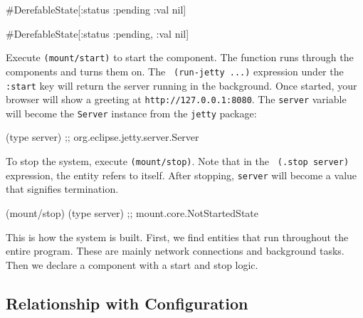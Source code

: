 \ifnarrow

\begin{english}
  \begin{clojure}
#DerefableState[{:status :pending
                 :val nil}]
  \end{clojure}
\end{english}

\else

\begin{english}
  \begin{clojure}
#DerefableState[{:status :pending, :val nil}]
  \end{clojure}
\end{english}

\fi


Execute \texttt{(mount\-/start)} to start the component. The function runs through the components and turns them on. The \verb| (run-jetty ...)| expression under the \verb|:start| key will return the server running in the background. Once started, your browser will show a greeting at \verb|http://127.0.0.1:8080|. The \verb|server| variable will become the \verb|Server| instance from the \verb|jetty| package:

\begin{english}
  \begin{clojure}
(type server)
;; org.eclipse.jetty.server.Server
  \end{clojure}
\end{english}

To stop the system, execute \verb|(mount/stop)|. Note that in the \verb| (.stop server)| expression, the entity refers to itself. After stopping, \verb|server| will become a value that signifies termination.

\begin{english}
  \begin{clojure}
(mount/stop)
(type server)
;; mount.core.NotStartedState
  \end{clojure}
\end{english}

This is how the system is built. First, we find entities that run throughout the entire program. These are mainly network connections and background tasks. Then we declare a component with a start and stop logic.

\subsection{Relationship with Configuration}

